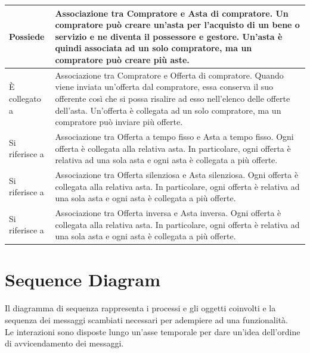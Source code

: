 \begin{longtable}{|C{3.5cm}|L{11.2cm}|}
            \hline
                Possiede &
                Associazione tra Compratore e Asta di compratore. Un compratore può creare un'asta per l'acquisto di un bene o servizio e ne diventa il possessore e gestore. Un'asta è quindi associata ad un solo compratore, ma un compratore può creare più aste.\\
            \hline
                È collegato a &
                Associazione tra Compratore e Offerta di compratore. Quando viene inviata un'offerta dal compratore, essa conserva il suo offerente così che si possa risalire ad esso nell'elenco delle offerte dell'asta. Un'offerta è collegata ad un solo compratore, ma un compratore può inviare più offerte.\\
            \hline
                Si riferisce a &
                Associazione tra Offerta a tempo fisso e Asta a tempo fisso. Ogni offerta è collegata alla relativa asta. In particolare, ogni offerta è relativa ad una sola asta e ogni asta è collegata a più offerte.\\
            \hline
                Si riferisce a &
                Associazione tra Offerta silenziosa e Asta silenziosa. Ogni offerta è collegata alla relativa asta. In particolare, ogni offerta è relativa ad una sola asta e ogni asta è collegata a più offerte.\\
            \hline
                Si riferisce a &
                Associazione tra Offerta inversa e Asta inversa. Ogni offerta è collegata alla relativa asta. In particolare, ogni offerta è relativa ad una sola asta e ogni asta è collegata a più offerte.\\
            \hline
        \end{longtable}

    \clearpage
    
    \section{Sequence Diagram}
        Il diagramma di sequenza rappresenta i processi e gli oggetti coinvolti e la sequenza dei messaggi scambiati necessari per adempiere ad una funzionalità. \\
        Le interazioni sono disposte lungo un'asse temporale per dare un'idea dell'ordine di avvicendamento dei messaggi.

